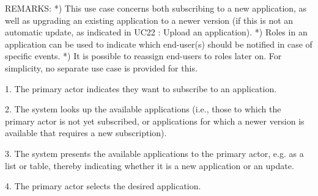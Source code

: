 {{{            REMARKS:
                *) This use case concerns both subscribing to a new application, as well as upgrading an existing
                   application to a newer version (if this is not an automatic update, as indicated in UC22 : Upload an application).
                *) Roles in an application can be used to indicate which end-user(s) should be notified in case of specific events.
                *) It is possible to reassign end-users to roles later on. For simplicity, no separate use case is provided for this.

            1. The primary actor indicates they want to subscribe to an application.

            2. The system looks up the available applications (i.e., those to which the primary actor is not yet subscribed,
               or applications for which a newer version is available that requires a new subscription).

            3. The system presents the available applications to the primary actor, e.g. as a list or table,
               thereby indicating whether it is a new application or an update.

            4. The primary actor selects the desired application.

}}}
